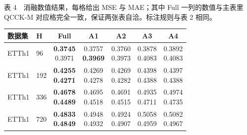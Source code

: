 \begin{center}

\begin{minipage}{\textwidth}

\scriptsize

表 4　消融数值结果，每格给出 MSE 与 MAE；其中 Full 一列的数值与主表里 QCCK-M 对应格完全一致，保证两张表自洽。标注规则与表 2 相同。\\[2pt]

\centering

\setlength{\tabcolsep}{4pt}

\begin{tabular}{@{}llccccc@{}}

\hline

数据集 & H & Full & A1 & A2 & A3 & A4 \\ \hline

ETTh1 & 96 & \shortstack{\colorbox[gray]{0.82}{\textbf{0.3745}}\\\colorbox[gray]{0.92}{0.3971}} & \shortstack{\colorbox[gray]{0.92}{0.3757}\\\colorbox[gray]{0.82}{\textbf{0.3969}}} & \shortstack{0.3760\\0.3973} & \shortstack{0.3878\\0.4083} & \shortstack{0.3892\\0.4083} \\ \hline

ETTh1 & 192 & \shortstack{\colorbox[gray]{0.82}{\textbf{0.4255}}\\\colorbox[gray]{0.82}{\textbf{0.4271}}} & \shortstack{\colorbox[gray]{0.92}{0.4269}\\\colorbox[gray]{0.92}{0.4278}} & \shortstack{\colorbox[gray]{0.92}{0.4269}\\0.4282} & \shortstack{0.4398\\0.4388} & \shortstack{0.4397\\0.4388} \\ \hline

ETTh1 & 336 & \shortstack{\colorbox[gray]{0.82}{\textbf{0.4678}}\\\colorbox[gray]{0.82}{\textbf{0.4489}}} & \shortstack{0.4695\\0.4518} & \shortstack{\colorbox[gray]{0.92}{0.4691}\\\colorbox[gray]{0.92}{0.4515}} & \shortstack{0.4935\\0.4711} & \shortstack{0.4974\\0.4735} \\ \hline

ETTh1 & 720 & \shortstack{\colorbox[gray]{0.82}{\textbf{0.4833}}\\\colorbox[gray]{0.82}{\textbf{0.4849}}} & \shortstack{0.4948\\0.4932} & \shortstack{\colorbox[gray]{0.92}{0.4924}\\\colorbox[gray]{0.92}{0.4907}} & \shortstack{0.5058\\0.4959} & \shortstack{0.5082\\0.4967} \\ \hline


\end{tabular}
\end{minipage}
\end{center}
